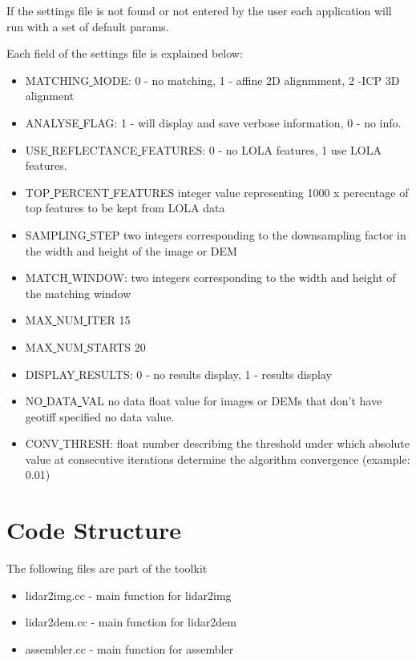 \documentclass[12pt]{article}
\begin{document}
If the settings file is not found or not entered by the user each application will run with a set of default params.

Each field of the settings file is explained below:
\begin{itemize}
\item{MATCHING\underline{ }MODE}: 0 - no matching, 1 - affine 2D alignmment, 2 -ICP 3D alignment\\
\item{ANALYSE\underline{ }FLAG}:  1 - will display and save verbose information, 0 - no info.\\
\item{USE\underline{ }REFLECTANCE\underline{ }FEATURES}: 0 - no LOLA features, 1 use LOLA features.\\ 
\item{TOP\underline{ }PERCENT\underline{ }FEATURES} integer value representing 1000 x perecntage of top features to be kept from LOLA data\\
\item{SAMPLING\underline{ }STEP} two integers corresponding to the downsampling factor in the width and height of the image or DEM\\
\item{MATCH\underline{ }WINDOW}: two integers corresponding to the width and height of the matching window\\
\item{MAX\underline{ }NUM\underline{ }ITER} 15\\
\item{MAX\underline{ }NUM\underline{ }STARTS} 20\\
\item{DISPLAY\underline{ }RESULTS}: 0 - no results display, 1 - results display\\
\item{NO\underline{ }DATA\underline{ }VAL} no data float value for images or DEMs that don't have geotiff specified no data value.\\
\item{CONV\underline{ }THRESH}: float number describing the threshold under which absolute value at consecutive iterations determine 
                                the algorithm convergence (example: 0.01)\\
\end{itemize}


\section{Code Structure}
The following files are part of the toolkit
\begin{itemize}
\item{lidar2img.cc} - main function for lidar2img
\item{lidar2dem.cc} - main function for lidar2dem 
\item{assembler.cc} - main function for assembler
\end{itemize}
\end{document}
